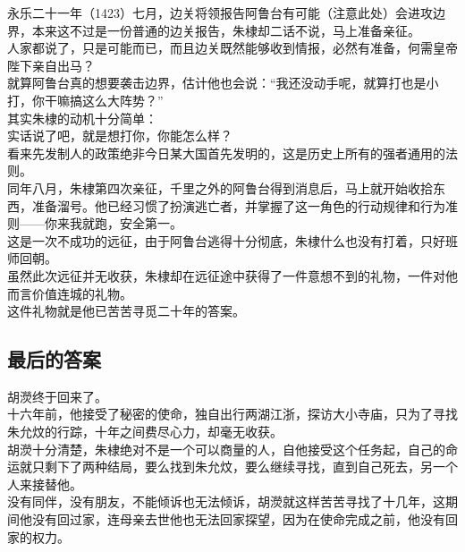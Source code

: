 \begin{multicols}{\theparacolNo}
永乐二十一年（1423）七月，边关将领报告阿鲁台有可能（注意此处）会进攻边界，本来这不过是一份普通的边关报告，朱棣却二话不说，马上准备亲征。\\

人家都说了，只是可能而已，而且边关既然能够收到情报，必然有准备，何需皇帝陛下亲自出马？\\

就算阿鲁台真的想要袭击边界，估计他也会说：“我还没动手呢，就算打也是小打，你干嘛搞这么大阵势？”\\

其实朱棣的动机十分简单：\\

实话说了吧，就是想打你，你能怎么样？\\

看来先发制人的政策绝非今日某大国首先发明的，这是历史上所有的强者通用的法则。\\

同年八月，朱棣第四次亲征，千里之外的阿鲁台得到消息后，马上就开始收拾东西，准备溜号。他已经习惯了扮演逃亡者，并掌握了这一角色的行动规律和行为准则——你来我就跑，安全第一。\\

这是一次不成功的远征，由于阿鲁台逃得十分彻底，朱棣什么也没有打着，只好班师回朝。\\

虽然此次远征并无收获，朱棣却在远征途中获得了一件意想不到的礼物，一件对他而言价值连城的礼物。\\

这件礼物就是他已苦苦寻觅二十年的答案。\\

\subsection{最后的答案}
胡濙终于回来了。\\

十六年前，他接受了秘密的使命，独自出行两湖江浙，探访大小寺庙，只为了寻找朱允炆的行踪，十年之间费尽心力，却毫无收获。\\

胡濙十分清楚，朱棣绝对不是一个可以商量的人，自他接受这个任务起，自己的命运就只剩下了两种结局，要么找到朱允炆，要么继续寻找，直到自己死去，另一个人来接替他。\\

没有同伴，没有朋友，不能倾诉也无法倾诉，胡濙就这样苦苦寻找了十几年，这期间他没有回过家，连母亲去世他也无法回家探望，因为在使命完成之前，他没有回家的权力。\\


\end{multicols}
